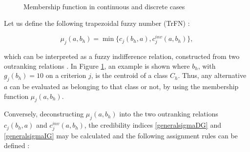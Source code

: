 \documentclass[]{elsarticle}
\theoremstyle{definition}
\begin{document}
\def \q {1}
\def \p {2}
\def \qq {1.5}
\def \pp {3}
\def \xmina{-3}
\def \xmaxa{.5}
\def \xminb{-.5}
\def \xmaxb{4}
\def \ymax{1}
\def \xb{2*\p}

\begin{figure}[hbtp]
\scriptsize
\centering
{}
\caption{Membership function in continuous and discrete cases}
\label{mu}
\end{figure}


Let us define the following trapezoidal fuzzy number (TrFN)  \citep{Ban2011}:

\begin{equation}
\mu_j(a,b_h)=\min\{c_j(b_h,a), c^{inv}_j(a,b_h)\},
\label{trfnmu}
\end{equation}


\noindent
which can be interpreted as a fuzzy indifference  relation, constructed from two outranking relations \citep{perny1992}. In Figure \ref{mu},  an example is shown where $b_h$, with $g_j(b_h)=10$ on a criterion $j$,  is the centroid of a class $C_h$. Thus, any alternative $a$ can be evaluated as belonging to that class or not, by using the membership function $\mu_j(a,b_h)$.

Conversely, deconstructing $\mu_j(a,b_h)$ into the two outranking relations $c_j(b_h,a)$ and  $c^{inv}_j(a,b_h)$, the credibility indices \eqref{generalsigmaDG} and \eqref{generalsigmaIG} may be calculated and the following assignment rules can be defined \citep{pereira2018}:
\end{document}
